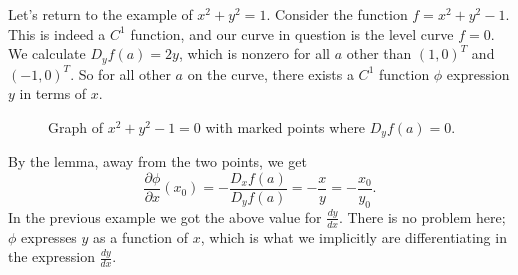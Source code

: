 \documentclass[12pt]{article}
\begin{document}
\begin{example}
	Let's return to the example of $x^2+y^2=1$. Consider the function $f=x^2+y^2-1$. This is indeed a $C^1$ function, and our curve in question is the level curve $f=0$. We calculate $D_yf(a)=2y$, which is nonzero for all $a$ other than $(1, 0)^T$ and $(-1, 0)^T$. So for all other $a$ on the curve, there exists a $C^1$ function $\phi$ expression $y$ in terms of $x$.

	\begin{figure}[h] 
	\centering
	\caption{Graph of $x^2+y^2-1=0$ with marked points where $D_yf(a)=0$.}
	\end{figure}

	By the lemma, away from the two points, we get 
	\begin{equation*}
		\frac{\partial\phi}{\partial x}(x_0) = -\frac{D_xf(a)}{D_yf(a)}=-\frac{x}{y}=-\frac{x_0}{y_0}.
	\end{equation*}
	In the previous example we got the above value for $\frac{dy}{dx}$. There is no problem here; $\phi$ expresses $y$ as a function of $x$, which is what we implicitly are differentiating in the expression $\frac{dy}{dx}$.
\end{example}
\end{document}
